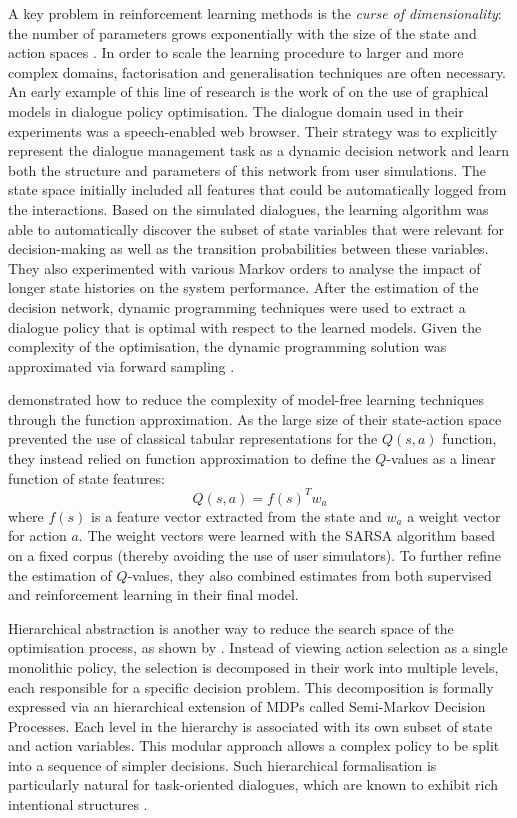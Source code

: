 A key problem in reinforcement learning methods is the \textit{curse of dimensionality}: the number of parameters grows exponentially with the size of the state and action spaces \citep{citeulike:112017}.  In order to scale the learning procedure to larger and more complex domains, factorisation and generalisation techniques are often necessary.  An early example of this line of research is the work of \cite{PaekC06} on the use of graphical models in dialogue policy optimisation. The dialogue domain used in their experiments was a speech-enabled web browser.  Their strategy was to explicitly represent the dialogue management task as a dynamic decision network and learn both the structure and parameters of this network from user simulations.  The state space initially included all features that could be automatically logged from the interactions.  Based on the simulated dialogues, the learning algorithm was able to automatically discover the subset of state variables that were relevant for decision-making as well as the transition probabilities between these variables.   They also experimented with various Markov orders to analyse the impact of longer state histories on the system performance.  After the estimation of the decision network, dynamic programming techniques were used to extract a dialogue policy that is optimal with respect to the learned models. Given the complexity of the optimisation, the dynamic programming solution was approximated via forward sampling \citep{Kearns99asparse}. 

\cite{Henderson:2008} demonstrated how to reduce the complexity of model-free learning techniques through the function approximation.  As the large size of their state-action space prevented the use of classical tabular representations for the $Q(s,a)$ function, they instead relied on function approximation to define the $Q$-values as a linear function of state features:
\begin{equation}
Q(s,a) = f(s)^{T} w_a 
\end{equation}
where $f(s)$ is a feature vector extracted from the state and $w_a$ a weight vector for action $a$. The weight vectors were learned with the SARSA algorithm based on a fixed corpus (thereby avoiding the use of user simulators). To further refine the estimation of $Q$-values, they also combined estimates from both supervised and reinforcement learning in their final model. 

Hierarchical abstraction is another way to reduce the search space of the optimisation process, as shown by \cite{Heriberto2011}. Instead of viewing action selection as a single monolithic policy, the selection is decomposed in their work into multiple levels, each responsible for a specific decision problem.  This decomposition is formally expressed via an hierarchical extension of MDPs called Semi-Markov Decision Processes.  Each level in the hierarchy is associated with its own subset of state and action variables.  This modular approach allows a complex policy to be split into a sequence of simpler decisions.  Such hierarchical formalisation is particularly natural for task-oriented dialogues, which are known to exhibit rich intentional structures \citep{Grosz:1986,Litman87}. 

